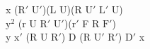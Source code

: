 x ($\text{R}'$ $\text{U}'$)(L U)(R $\text{U}'$ $\text{L}'$ U)\\
$\text{y}^2$ (r U $\text{R}'$ $\text{U}'$)($\text{r}'$ F R $\text{F}'$)\\
y $\text{x}'$ (R U $\text{R}'$) D (R $\text{U}'$ $\text{R}'$) $\text{D}'$ x\\
